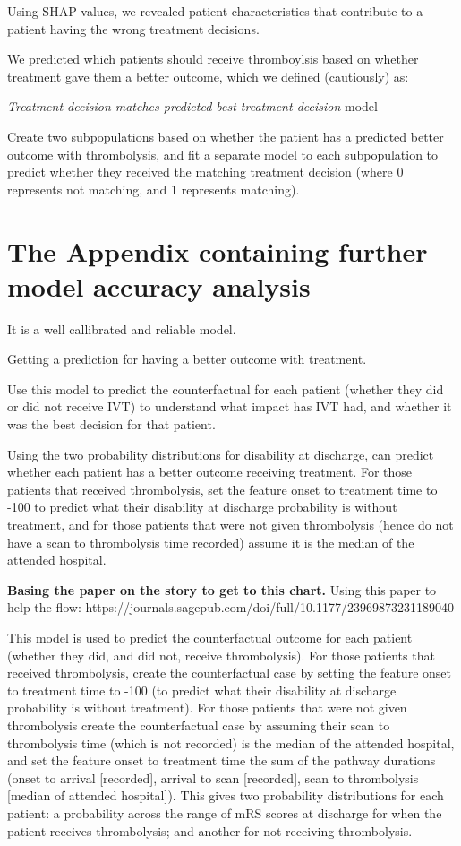 Using SHAP values, we revealed patient characteristics that contribute to a patient having the wrong treatment decisions.

We predicted which patients should receive thromboylsis based on whether treatment gave them a better outcome, which we defined (cautiously) as: 



\textit{Treatment decision matches predicted best treatment decision} model



Create two subpopulations based on whether the patient has a predicted better outcome with thrombolysis, and fit a separate model to each subpopulation to predict whether they received the matching treatment decision (where 0 represents not matching, and 1 represents matching).


\section{The Appendix containing further model accuracy analysis}

It is a well callibrated and reliable model.

\item Getting a prediction for having a better outcome with treatment.   

Use this model to predict the counterfactual for each patient (whether they did or did not receive IVT) to understand what impact has IVT had, and whether it was the best decision for that patient.

Using the two probability distributions for disability at discharge, can predict whether each patient has a better outcome receiving treatment. For those patients that received thrombolysis, set the feature onset to treatment time to -100 to predict what their disability at discharge probability is without treatment, and for those patients that were not given thrombolysis (hence do not have a scan to thrombolysis time recorded) assume it is the median of the attended hospital.


\textbf{Basing the paper on the story to get to this chart.}
Using this paper to help the flow: https://journals.sagepub.com/doi/full/10.1177/23969873231189040


This model is used to predict the counterfactual outcome for each patient (whether they did, and did not, receive thrombolysis). For those patients that received thrombolysis, create the counterfactual case by setting the feature onset to treatment time to -100 (to predict what their disability at discharge probability is without treatment). For those patients that were not given thrombolysis create the counterfactual case by assuming their scan to thrombolysis time (which is not recorded) is the median of the attended hospital, and set the feature onset to treatment time the sum of the pathway durations (onset to arrival [recorded], arrival to scan [recorded], scan to thrombolysis [median of attended hospital]). This gives two probability distributions for each patient: a probability across the range of mRS scores at discharge for when the patient receives thrombolysis; and another for not receiving thrombolysis. 

